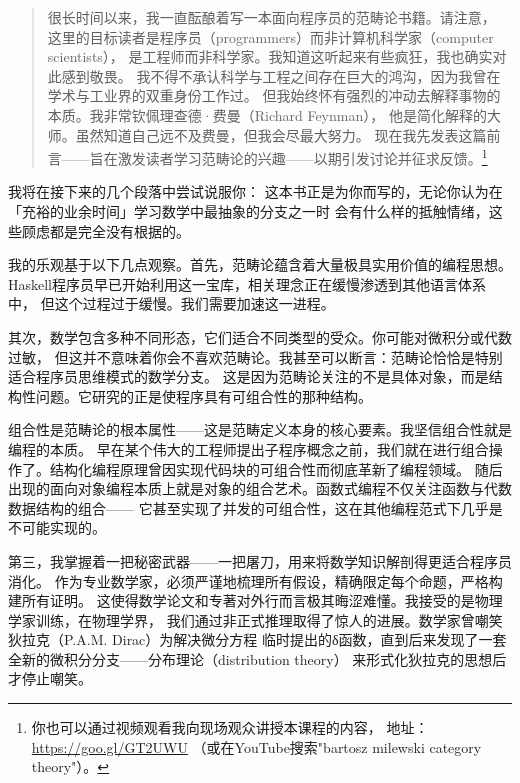 
\begin{quote}
  很长时间以来，我一直酝酿着写一本面向程序员的范畴论书籍。请注意，
  这里的目标读者是程序员（programmers）而非计算机科学家（computer scientists），
  是工程师而非科学家。我知道这听起来有些疯狂，我也确实对此感到敬畏。
  我不得不承认科学与工程之间存在巨大的鸿沟，因为我曾在学术与工业界的双重身份工作过。
  但我始终怀有强烈的冲动去解释事物的本质。我非常钦佩理查德·费曼（Richard Feynman），
  他是简化解释的大师。虽然知道自己远不及费曼，但我会尽最大努力。
  现在我先发表这篇前言——旨在激发读者学习范畴论的兴趣——以期引发讨论并征求反馈。\footnote{
    你也可以通过视频观看我向现场观众讲授本课程的内容，
    地址：\href{https://goo.gl/GT2UWU}{https://goo.gl/GT2UWU}
    （或在YouTube搜索"bartosz milewski category theory"）。}
\end{quote}

\lettrine[lhang=0.17]{我}{将在}接下来的几个段落中尝试说服你：
这本书正是为你而写的，无论你认为在「充裕的业余时间」学习数学中最抽象的分支之一时
会有什么样的抵触情绪，这些顾虑都是完全没有根据的。

我的乐观基于以下几点观察。首先，范畴论蕴含着大量极具实用价值的编程思想。
Haskell程序员早已开始利用这一宝库，相关理念正在缓慢渗透到其他语言体系中，
但这个过程过于缓慢。我们需要加速这一进程。

其次，数学包含多种不同形态，它们适合不同类型的受众。你可能对微积分或代数过敏，
但这并不意味着你会不喜欢范畴论。我甚至可以断言：范畴论恰恰是特别适合程序员思维模式的数学分支。
这是因为范畴论关注的不是具体对象，而是结构性问题。它研究的正是使程序具有可组合性的那种结构。

组合性是范畴论的根本属性——这是范畴定义本身的核心要素。我坚信组合性就是编程的本质。
早在某个伟大的工程师提出子程序概念之前，我们就在进行组合操作了。结构化编程原理曾因实现代码块的可组合性而彻底革新了编程领域。
随后出现的面向对象编程本质上就是对象的组合艺术。函数式编程不仅关注函数与代数数据结构的组合——
它甚至实现了并发的可组合性，这在其他编程范式下几乎是不可能实现的。

第三，我掌握着一把秘密武器——一把屠刀，用来将数学知识解剖得更适合程序员消化。
作为专业数学家，必须严谨地梳理所有假设，精确限定每个命题，严格构建所有证明。
这使得数学论文和专著对外行而言极其晦涩难懂。我接受的是物理学家训练，在物理学界，
我们通过非正式推理取得了惊人的进展。数学家曾嘲笑狄拉克（P.A.M. Dirac）为解决微分方程
临时提出的δ函数，直到后来发现了一套全新的微积分分支——分布理论（distribution theory）
来形式化狄拉克的思想后才停止嘲笑。

